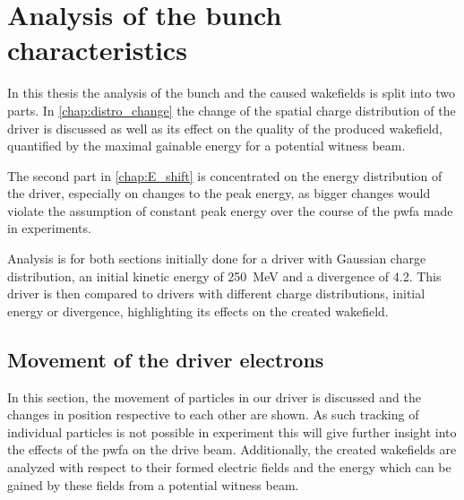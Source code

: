 \documentclass[bachelor_thesis]{subfiles}
\begin{document}
\chapter{Analysis of the bunch characteristics}
In this thesis the analysis of the bunch and the caused wakefields is split into two parts. In \autoref{chap:distro_change} the change of the spatial charge distribution of the driver is discussed as well as its effect on the quality of the produced wakefield, quantified by the maximal gainable energy for a potential witness beam.

The second part in \autoref{chap:E_shift} is concentrated on the energy distribution of the driver, especially on changes to the peak energy, as bigger changes would violate the assumption of constant peak energy over the course of the \gls{pwfa} made in experiments.

Analysis is for both sections initially done for a driver with Gaussian charge distribution, an initial kinetic energy of \qty{250}{\MeV} and a divergence of \qty{4.2}{\mrad}. This driver is then compared to drivers with different charge distributions, initial energy or divergence,
highlighting its effects on the created wakefield. 
 
\section{Movement of the driver electrons} \label{chap:distro_change}
In this section, the movement of particles in our driver is discussed and the changes in position respective to each other are shown. As such tracking of individual particles is not possible in experiment
this will give further insight into the effects of the \gls{pwfa} on the drive beam. Additionally, the created wakefields are analyzed with respect to their formed electric fields and the energy which can be
gained by these fields from a potential witness beam. 
\end{document}
